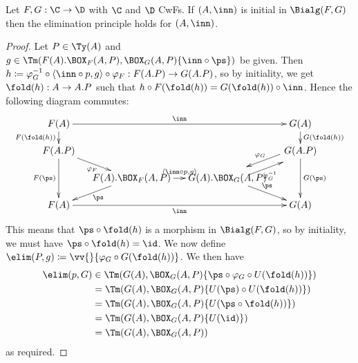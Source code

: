 \documentclass{article}
\begin{document}
\begin{theorem}
  Let $F, G : \C \to \D$ with $\C$ and $\D$ CwFs. If $(A, \inn)$ is
  initial in $\Bialg(F, G)$ then the elimination principle holds for
  $(A, \inn)$.
\end{theorem}
\begin{proof}
  Let $P \in \Ty(A)$ and $g \in \Tm(F(A).\BOX_F(A, P), \BOX_G(A,
  P)\{\inn \circ \ps\})$ be given. Then $h \coloneqq \varphi_G^{-1}
  \circ \langle \inn \circ p, g\rangle \circ \varphi_F : F(A.P) \to
  G(A.P)$, so by initiality, we get $\fold(h) : A \to A.P$ such that
  $h \circ F(\fold(h)) = G(\fold(h)) \circ \inn$. Hence the following
  diagram commutes:
\[
\xymatrix@-1pc{
F(A) \ar^-{\inn}[rrr] \ar_-{F(\fold(h))}[d] & & & G(A) \ar^-{G(\fold(h))}[d] \\
F(A.P) \ar_{\varphi_F}[dr] \ar_-{F(\ps)}[dd] & & & G(A.P) \ar@<-1ex>_-{\varphi_G}[dl] \ar^-{G(\ps)}[dd]\\
 & F(A).\BOX_F(A,P) \ar^{\langle \inn \circ p, g\rangle}[r] \ar^{\ps}[dl]& G(A).\BOX_G(A,P) \ar@<-1ex>_-{\varphi_G^{-1}}[ur] \ar^{\ps}[dr] & \\
F(A) \ar_-{\inn}[rrr] & & & G(A)
}
\]
This means that $\ps \circ \fold(h)$ is a morphism in $\Bialg(F, G)$,
so by initiality, we must have $\ps \circ \fold(h) = \id$. We now
define $\elim(P, g) \coloneqq \vv{}\{\varphi_G \circ G(\fold(h))\}$.
We then have
\begin{align*}
  \elim(p, G) &\in \Tm(G(A), \BOX_G(A, P)\{ \ps \circ \varphi_G \circ U(\fold(h))\}) \\
              &=  \Tm(G(A), \BOX_G(A, P)\{ U(\ps) \circ U(\fold(h))\}) \\
              &=  \Tm(G(A), \BOX_G(A, P)\{ U(\ps \circ \fold(h))\}) \\
              &=  \Tm(G(A), \BOX_G(A, P)\{ U(\id)\}) \\
              &=  \Tm(G(A), \BOX_G(A, P))
\end{align*}
as required.


\end{proof}
\end{document}
